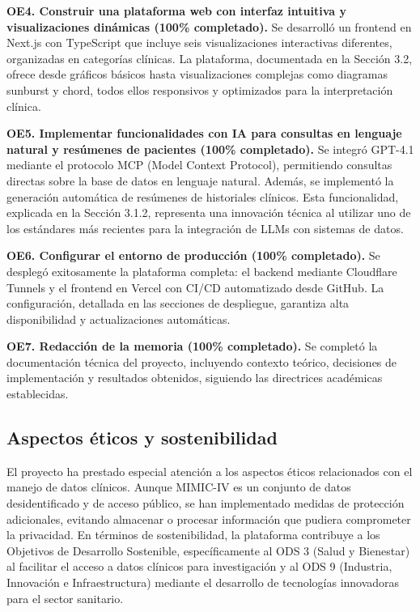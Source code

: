 \textbf{OE4. Construir una plataforma web con interfaz intuitiva y visualizaciones dinámicas (100\% completado).} Se desarrolló un frontend en Next.js con TypeScript que incluye seis visualizaciones interactivas diferentes, organizadas en categorías clínicas. La plataforma, documentada en la Sección 3.2, ofrece desde gráficos básicos hasta visualizaciones complejas como diagramas sunburst y chord, todos ellos responsivos y optimizados para la interpretación clínica.

\textbf{OE5. Implementar funcionalidades con IA para consultas en lenguaje natural y resúmenes de pacientes (100\% completado).} Se integró GPT-4.1 mediante el protocolo MCP (Model Context Protocol), permitiendo consultas directas sobre la base de datos en lenguaje natural. Además, se implementó la generación automática de resúmenes de historiales clínicos. Esta funcionalidad, explicada en la Sección 3.1.2, representa una innovación técnica al utilizar uno de los estándares más recientes para la integración de LLMs con sistemas de datos.

\textbf{OE6. Configurar el entorno de producción (100\% completado).} Se desplegó exitosamente la plataforma completa: el backend mediante Cloudflare Tunnels y el frontend en Vercel con CI/CD automatizado desde GitHub. La configuración, detallada en las secciones de despliegue, garantiza alta disponibilidad y actualizaciones automáticas.

\textbf{OE7. Redacción de la memoria (100\% completado).} Se completó la documentación técnica del proyecto, incluyendo contexto teórico, decisiones de implementación y resultados obtenidos, siguiendo las directrices académicas establecidas.

\subsection{Aspectos éticos y sostenibilidad}

El proyecto ha prestado especial atención a los aspectos éticos relacionados con el manejo de datos clínicos. Aunque MIMIC-IV es un conjunto de datos desidentificado y de acceso público, se han implementado medidas de protección adicionales, evitando almacenar o procesar información que pudiera comprometer la privacidad. En términos de sostenibilidad, la plataforma contribuye a los Objetivos de Desarrollo Sostenible, específicamente al ODS 3 (Salud y Bienestar) al facilitar el acceso a datos clínicos para investigación y al ODS 9 (Industria, Innovación e Infraestructura) mediante el desarrollo de tecnologías innovadoras para el sector sanitario.


